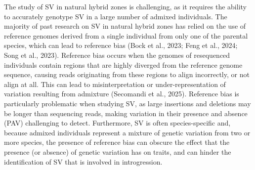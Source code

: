 \documentclass[
]{agujournal2019}
\begin{document}
The study of SV in natural hybrid zones is challenging, as it requires
the ability to accurately genotype SV in a large number of admixed
individuals. The majority of past research on SV in natural hybrid zones
has relied on the use of reference genomes derived from a single
individual from only one of the parental species, which can lead to
reference bias (Bock et al., 2023; Feng et al., 2024; Song et al.,
2023). Reference bias occurs when the genomes of resequenced individuals
contain regions that are highly diverged from the reference genome
sequence, causing reads originating from these regions to align
incorrectly, or not align at all. This can lead to misinterpretation or
under-representation of variation resulting from admixture (Secomandi et
al., 2025). Reference bias is particularly problematic when studying SV,
as large insertions and deletions may be longer than sequencing reads,
making variation in their presence and absence (PAV) challenging to
detect. Furthermore, SV is often species-specific and, because admixed
individuals represent a mixture of genetic variation from two or more
species, the presence of reference bias can obscure the effect that the
presence (or absence) of genetic variation has on traits, and can hinder
the identification of SV that is involved in introgression.
\end{document}
